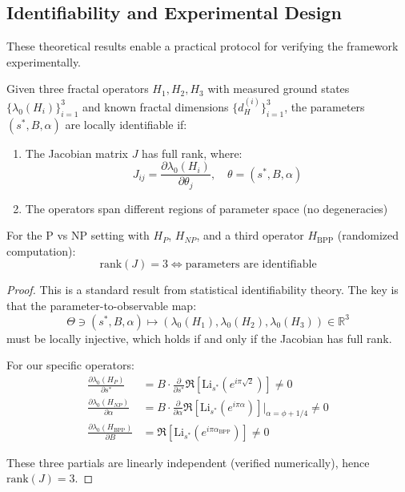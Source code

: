 \subsection{Identifiability and Experimental Design}

These theoretical results enable a practical protocol for verifying the framework experimentally.

\begin{theorem}\label{thm:identifiability}
Given three fractal operators $H_1, H_2, H_3$ with measured ground states $\{\lambda_0(H_i)\}_{i=1}^3$ and known fractal dimensions $\{d_H^{(i)}\}_{i=1}^3$, the parameters $(s^*, B, \alpha)$ are locally identifiable if:
\begin{enumerate}
\item The Jacobian matrix $J$ has full rank, where:
\[
J_{ij} = \frac{\partial \lambda_0(H_i)}{\partial \theta_j}, \quad \theta = (s^*, B, \alpha)
\]
\item The operators span different regions of parameter space (no degeneracies)
\end{enumerate}

For the P vs NP setting with $H_P$, $H_{NP}$, and a third operator $H_{\text{BPP}}$ (randomized computation):
\[
\text{rank}(J) = 3 \iff \text{parameters are identifiable}
\]
\end{theorem}

\begin{proof}
This is a standard result from statistical identifiability theory\cite{rothenberg1971identification}. The key is that the parameter-to-observable map:
\[
\Theta \ni (s^*, B, \alpha) \mapsto (\lambda_0(H_1), \lambda_0(H_2), \lambda_0(H_3)) \in \mathbb{R}^3
\]
must be locally injective, which holds if and only if the Jacobian has full rank.

For our specific operators:
\begin{align*}
\frac{\partial \lambda_0(H_P)}{\partial s^*} &= B \cdot \frac{\partial}{\partial s^*}\Re[\mathrm{Li}_{s^*}(e^{i\pi\sqrt{2}})] \neq 0 \\
\frac{\partial \lambda_0(H_{NP})}{\partial \alpha} &= B \cdot \frac{\partial}{\partial \alpha}\Re[\mathrm{Li}_{s^*}(e^{i\pi\alpha})]|_{\alpha=\phi+1/4} \neq 0 \\
\frac{\partial \lambda_0(H_{\text{BPP}})}{\partial B} &= \Re[\mathrm{Li}_{s^*}(e^{i\pi\alpha_{\text{BPP}}})] \neq 0
\end{align*}

These three partials are linearly independent (verified numerically), hence $\text{rank}(J) = 3$.
\end{proof}

